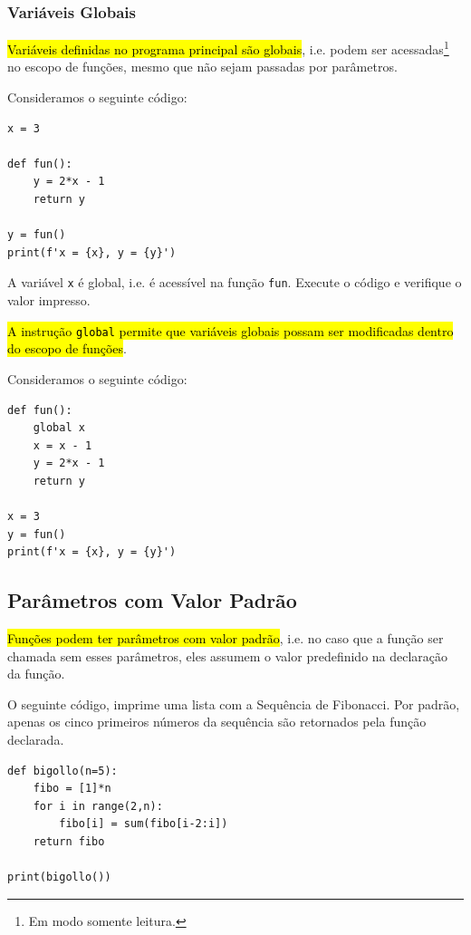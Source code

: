 \subsubsection{Variáveis Globais}

\hl{Variáveis definidas no programa principal são globais}, i.e. podem ser acessadas\footnote{Em modo somente leitura.} no escopo de funções, mesmo que não sejam passadas por parâmetros.

\begin{ex}
  Consideramos o seguinte código:
\begin{lstlisting}
x = 3

def fun():
    y = 2*x - 1
    return y

y = fun()
print(f'x = {x}, y = {y}')
\end{lstlisting}
  A variável \lstinline+x+ é global, i.e. é acessível na função \lstinline+fun+. Execute o código e verifique o valor impresso.
\end{ex}

\hl{A instrução {\lstinline+global+} permite que variáveis globais possam ser modificadas dentro do escopo de funções}.

\begin{ex}
  Consideramos o seguinte código:
\begin{lstlisting}
def fun():
    global x
    x = x - 1
    y = 2*x - 1
    return y

x = 3
y = fun()
print(f'x = {x}, y = {y}')
\end{lstlisting}
\end{ex}

\subsection{Parâmetros com Valor Padrão}

\hl{Funções podem ter parâmetros com valor padrão}, i.e. no caso que a função ser chamada sem esses parâmetros, eles assumem o valor predefinido na declaração da função.

\begin{ex}
  O seguinte código, imprime uma lista com a Sequência de Fibonacci{\fibonacci}. Por padrão, apenas os cinco primeiros números da sequência são retornados pela função declarada.
\begin{lstlisting}
def bigollo(n=5):
    fibo = [1]*n
    for i in range(2,n):
        fibo[i] = sum(fibo[i-2:i])
    return fibo

print(bigollo())
\end{lstlisting}
\end{ex}

